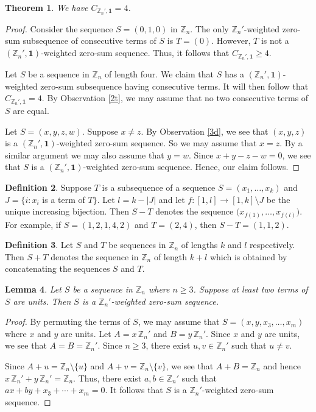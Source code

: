 \documentclass{article}[11pt]
\newtheorem{theorem}{Theorem}[section]
\newtheorem{lemma}[theorem]{Lemma}
\theoremstyle{definition}
\newtheorem{definition}[theorem]{Definition}
\begin{document}
\begin{theorem}\label{cnz}
We have $C_{\mathbb Z_n',\mathbf 1}=4$.
\end{theorem}

\begin{proof}
Consider the sequence $S=(0,1,0)$ in $\mathbb Z_n$. The only $\mathbb Z_n'$-weighted zero-sum subsequence of consecutive terms of $S$ is $T=(0)$. However, $T$ is not a $(\mathbb Z_n',\mathbf 1)$-weighted zero-sum sequence. Thus, it follows that $C_{\mathbb Z_n',\mathbf 1}\geq 4$.

Let $S$ be a sequence in $\mathbb Z_n$ of length four. We claim that $S$ has a $(\mathbb Z_n',\mathbf 1)$-weighted zero-sum subsequence having consecutive terms. It will then follow that $C_{\mathbb Z_n',\mathbf 1}=4$. By Observation \ref{2t}, we may assume that no two consecutive terms of $S$ are equal.

Let $S=(x,y,z,w)$. Suppose $x\neq z$. By Observation \ref{3d}, we see that $(x,y,z)$ is a $(\mathbb Z_n',\mathbf 1)$-weighted zero-sum sequence. So we may assume that $x=z$. By a similar argument we may also assume that $y=w$. Since $x+y-z-w=0$, we see that $S$ is a $(\mathbb Z_n',\mathbf 1)$-weighted zero-sum sequence. Hence, our claim follows.
\end{proof}

\begin{definition}
Suppose $T$ is a subsequence of a sequence $S=(x_1,\ldots,x_k)$ and $J=\{i:x_i$ is a term of $T\}$. Let $l=k-|J|$ and let $f:[1,l]\to [1,k]\setminus J$ be the unique increasing bijection. Then $S-T$ denotes the sequence $\big(x_{f(1)},\ldots,x_{f(l)}\big)$. For example, if $S=(1,2,1,4,2)$ and $T=(2,4)$, then $S-T=(1,1,2)$.
\end{definition}

\begin{definition}
Let $S$ and $T$ be sequences in $\mathbb Z_n$ of lengths $k$ and $l$ respectively. Then $S+T$ denotes the sequence in $\mathbb Z_n$ of length $k+l$ which is obtained by concatenating the sequences $S$ and $T$.
\end{definition}

\begin{lemma}\label{znzs}
Let $S$ be a sequence in $\mathbb Z_n$ where $n\geq 3$. Suppose at least two terms of $S$ are units. Then $S$ is a $\mathbb Z_n'$-weighted zero-sum sequence.
\end{lemma}

\begin{proof}
By permuting the terms of $S$, we may assume that $S=(x,y,x_3,\ldots,x_m)$ where $x$ and $y$ are units. Let $A=x\,\mathbb Z_n'$ and $B=y\,\mathbb Z_n'$. Since $x$ and $y$ are units, we see that $A=B=\mathbb Z_n'$. Since $n\geq 3$, there exist $u,v\in \mathbb Z_n'$ such that $u\neq v$.

Since $A+u=\mathbb Z_n \setminus \{u\}$ and $A+v=\mathbb Z_n \setminus \{v\}$, we see that $A+B=\mathbb Z_n$ and hence $x\,\mathbb Z_n'+y\,\mathbb Z_n'=\mathbb Z_n$. Thus, there exist $a,b\in \mathbb Z_n'$ such that $ax+by+x_3+\cdots +x_m=0$. It follows that $S$ is a $\mathbb Z_n'$-weighted zero-sum sequence.
\end{proof}
\end{document}
